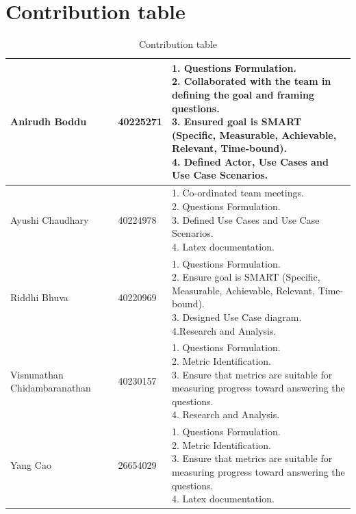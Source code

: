 \documentclass[letterpaper]{report}
\begin{document}
\chapter*{Contribution table}
\begin{table}[h]
\begin{tabular}{ | p{3cm} | p{3cm} | p{8cm} |}
 \hline
    Anirudh Boddu &  40225271 & {1. Questions Formulation. \newline 2. Collaborated with the team in defining the goal and framing questions. \newline 3. Ensured goal is SMART (Specific, Measurable, Achievable, Relevant, Time-bound).\newline 4. Defined Actor, Use Cases and Use Case Scenarios.}\\
    \hline
    Ayushi Chaudhary &  40224978 & {1. Co-ordinated team meetings. \newline 2. Questions Formulation. \newline 3. Defined Use Cases and Use Case Scenarios. \newline 4. Latex documentation.} \\
    \hline
    Riddhi Bhuva &  40220969 & {1. Questions Formulation. \newline 2. Ensure goal is SMART (Specific, Measurable, Achievable, Relevant, Time-bound). \newline 3. Designed Use Case diagram. \newline 4.Research and Analysis.}\\
    \hline
    Visnunathan Chidambaranathan &  40230157 & {1. Questions Formulation. \newline 2. Metric Identification. \newline 3. Ensure that metrics are suitable for measuring progress toward answering the questions. \newline 4. Research and Analysis.}\\
    \hline
    Yang Cao &  26654029 & {1. Questions Formulation. \newline 2. Metric Identification. \newline 3. Ensure that metrics are suitable for measuring progress toward answering the questions. \newline 4. Latex documentation.}\\
 \hline
 \end{tabular}
\renewcommand{\thetable}{\arabic{table}}
\caption{Contribution table}
\label{tab:table1}
\end{table}
\end{document}
